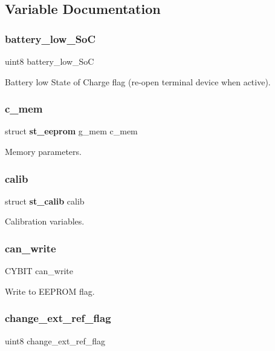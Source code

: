 \subsection{Variable Documentation}
\mbox{\label{globals_8h_ab4765549a3f6990d35f3d0740263b254}} 
\subsubsection{battery\+\_\+low\+\_\+\+SoC}
{\footnotesize\ttfamily uint8 battery\+\_\+low\+\_\+\+SoC}

Battery low State of Charge flag (re-\/open terminal device when active). \mbox{\label{globals_8h_a3ad3057028e3ab399e1d1549a8d67ab9}} 
\subsubsection{c\+\_\+mem}
{\footnotesize\ttfamily struct \textbf{ st\+\_\+eeprom} g\+\_\+mem c\+\_\+mem}

Memory parameters. \mbox{\label{globals_8h_aed96fdd8308fe2c4fc07c3b5db1c7bbb}} 
\subsubsection{calib}
{\footnotesize\ttfamily struct \textbf{ st\+\_\+calib} calib}

Calibration variables. \mbox{\label{globals_8h_acd57396ca1b2a02a76877acecd29ddb0}} 
\subsubsection{can\+\_\+write}
{\footnotesize\ttfamily C\+Y\+B\+IT can\+\_\+write}

Write to E\+E\+P\+R\+OM flag. \mbox{\label{globals_8h_a55787e40db60be586171023875f15130}} 
\subsubsection{change\+\_\+ext\+\_\+ref\+\_\+flag}
{\footnotesize\ttfamily uint8 change\+\_\+ext\+\_\+ref\+\_\+flag}

